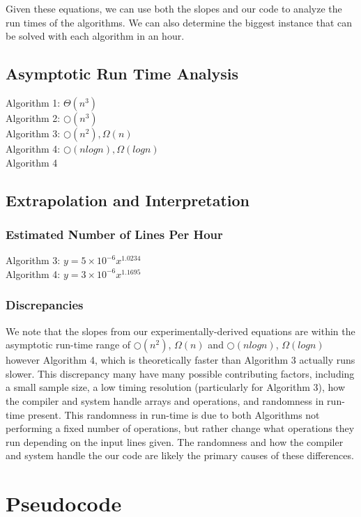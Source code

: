 \documentclass{article}
\begin{document}
Given these equations, we can use both the slopes and our code to analyze the run times of the algorithms. We can also determine the biggest instance that can be solved with each algorithm in an hour.

\subsection*{Asymptotic Run Time Analysis}
Algorithm 1: $\Theta(n^3)$\\
Algorithm 2: $\bigcirc(n^3)$\\
Algorithm 3: $\bigcirc(n^2),\Omega(n)$\\
Algorithm 4: $\bigcirc(nlogn),\Omega(logn)$\\
\indent Algorithm 4 

\subsection*{Extrapolation and Interpretation}
\subsubsection*{Estimated Number of Lines Per Hour}
Algorithm 3: $y=5 \times 10^{-6}x^{1.0234}$\\
Algorithm 4: $y=3 \times 10^{-6}x^{1.1695}$

\subsubsection*{Discrepancies}

We note that the slopes from our experimentally-derived equations are within the asymptotic run-time range of $\bigcirc(n^2)$, $\Omega(n)$ and $\bigcirc(nlogn)$, $\Omega(logn)$ however Algorithm 4, which is theoretically faster than Algorithm 3 actually runs slower. This discrepancy many have many possible contributing factors, including a small sample size, a low timing resolution (particularly for Algorithm 3), how the compiler and system handle arrays and operations, and randomness in run-time present. This randomness in run-time is due to both Algorithms not performing a fixed number of operations, but rather change what operations they run depending on the input lines given. The randomness and how the compiler and system handle the our code are likely the primary causes of these differences.

\pagebreak

\section*{Pseudocode}

\end{document}
